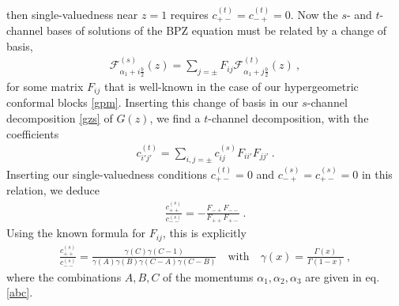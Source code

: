 \documentclass[12pt, a4paper]{article}
\theoremstyle{break}
\begin{document}
then single-valuedness near $z=1$ requires $c^{(t)}_{+-}=c^{(t)}_{-+}=0$. 
Now the $s$- and $t$-channel bases of solutions of the BPZ equation must be related by a change of basis,
\begin{align}
 \mathcal{F}^{(s)}_{\alpha_1+i\frac{b}{2}}(z) = \sum_{j=\pm} F_{ij} \mathcal{F}^{(t)}_{\alpha_1+j\frac{b}{2}}(z) \ ,
\end{align}
for some matrix $F_{ij}$ that is well-known in the case of our hypergeometric conformal blocks \eqref{gpm}.
Inserting this change of basis in our $s$-channel decomposition \eqref{gzs} of $G(z)$, we find a $t$-channel decomposition, with the coefficients
\begin{align}
 c^{(t)}_{i'j'}= \sum_{i,j=\pm} c^{(s)}_{ij} F_{ii'} F_{jj'} \ .
\end{align}
Inserting our single-valuedness conditions $c^{(t)}_{+-}=0$ and $c^{(s)}_{-+}=c^{(s)}_{+-}=0$ in this relation, we deduce
\begin{align}
 \frac{c_{++}^{(s)}}{c_{--}^{(s)}} = -\frac{F_{-+}F_{--}}{F_{++}F_{+-}} \ .
\end{align}
Using the known formula for $F_{ij}$, this is explicitly
\begin{align}
 \frac{c_{++}^{(s)}} {c_{--}^{(s)}}
 = \frac{\gamma(C)\gamma(C-1)}{\gamma(A)\gamma(B)\gamma(C-A)\gamma(C-B)}\quad \text{with} \quad \gamma(x) =\frac{\Gamma(x)}{\Gamma(1-x)}\ ,
 \label{eq:coc}
\end{align}
where the combinations $A,B,C$ of the momentums $\alpha_1,\alpha_2,\alpha_3$ are given in eq. \eqref{abc}.
\end{document}
